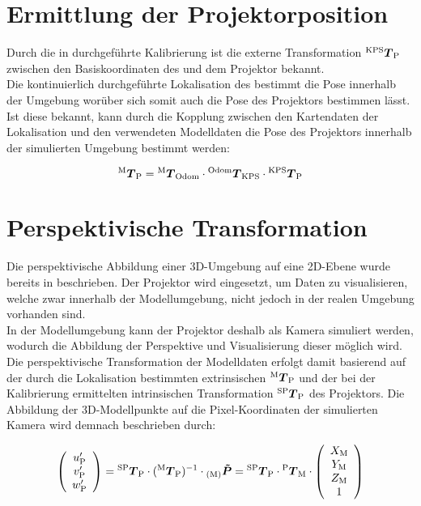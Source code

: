 \section{Ermittlung der Projektorposition}
Durch die in  durchgeführte Kalibrierung ist die externe Transformation ${^{\mathrm{KPS}}\mbox{\boldmath{$T$}}_{\mathrm{P}}}$ zwischen den Basiskoordinaten des  und dem Projektor bekannt.\\
Die kontinuierlich durchgeführte Lokalisation des  bestimmt die Pose innerhalb der Umgebung worüber sich somit auch die Pose des Projektors bestimmen lässt. Ist diese bekannt, kann durch die Kopplung zwischen den Kartendaten der Lokalisation und den verwendeten Modelldaten die Pose des Projektors innerhalb der simulierten Umgebung bestimmt werden:

\begin{equation}
{^{\mathrm{M}}\mbox{\boldmath{$T$}}_{\mathrm{P}}} = {^{\mathrm{M}}\mbox{\boldmath{$T$}}_{\mathrm{Odom}}} \cdot {^{\mathrm{Odom}}\mbox{\boldmath{$T$}}_{\mathrm{KPS}}} \cdot {^{\mathrm{KPS}}\mbox{\boldmath{$T$}}_{\mathrm{P}}}
\end{equation}

\section{Perspektivische Transformation}
Die perspektivische Abbildung einer 3D-Umgebung auf eine 2D-Ebene wurde bereits in  beschrieben. Der Projektor wird eingesetzt, um Daten zu visualisieren, welche zwar innerhalb der Modellumgebung, nicht jedoch in der realen Umgebung vorhanden sind.\\
In der Modellumgebung kann der Projektor deshalb als Kamera simuliert werden, wodurch die Abbildung der Perspektive und Visualisierung dieser möglich wird. Die perspektivische Transformation der Modelldaten erfolgt damit basierend auf der durch die Lokalisation bestimmten extrinsischen ${^{\mathrm{M}}\mbox{\boldmath{$T$}}_{\mathrm{P}}}$ und der bei der Kalibrierung ermittelten intrinsischen Transformation ${^{\mathrm{SP}}\mbox{\boldmath{$T$}}_{\mathrm{P}}}$ des Projektors. Die Abbildung der 3D-Modellpunkte auf die Pixel-Koordinaten der simulierten Kamera wird demnach beschrieben durch:

\begin{equation}
\left(\begin{array}{c}
u_{{\mathrm{P}}}'\\
v_{{\mathrm{P}}}'\\
w_{{\mathrm{P}}}'
\end{array}\right)
= {^{\mathrm{SP}}\mbox{\boldmath{$T$}}_{\mathrm{P}}} \cdot ({^{\mathrm{M}}\mbox{\boldmath{$T$}}_{\mathrm{P}}})^{-1} \cdot {_{{\mathrm{(M)}}}}\mbox{\boldmath{$\tilde{P}$}} = {^{\mathrm{SP}}\mbox{\boldmath{$T$}}_{\mathrm{P}}} \cdot {^{\mathrm{P}}\mbox{\boldmath{$T$}}_{\mathrm{M}}} \cdot \left(\begin{array}{c}
X_{{\mathrm{M}}}\\
Y_{{\mathrm{M}}}\\
Z_{{\mathrm{M}}}\\
1
\end{array} \right)
\label{eq.proj_trans}
\end{equation}

